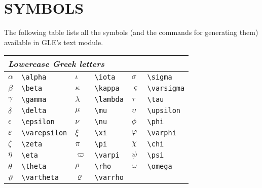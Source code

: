\chapter{SYMBOLS}
The following table lists all the symbols (and the commands for generating 
them) available in GLE's text module.

\begin{tabular}{llllll}
\\
\multicolumn{6}{l}{\em Lowercase Greek letters} \\ \hline
$\alpha$             & \verb+\alpha+             & $\iota$                 & \verb+\iota+               & $\sigma$        & \verb+\sigma+ \\
$\beta$              & \verb+\beta+              & $\kappa$                & \verb+\kappa+              & $\varsigma$     & \verb+\varsigma+ \\
$\gamma$             & \verb+\gamma+             & $\lambda$               & \verb+\lambda+             & $\tau$          & \verb+\tau+ \\
$\delta$             & \verb+\delta+             & $\mu$                   & \verb+\mu+                 & $\upsilon$      & \verb+\upsilon+ \\
$\epsilon$           & \verb+\epsilon+           & $\nu$                   & \verb+\nu+                 & $\phi$          & \verb+\phi+ \\
$\varepsilon$        & \verb+\varepsilon+        & $\xi$                   & \verb+\xi+                 & $\varphi$       & \verb+\varphi+ \\
$\zeta$              & \verb+\zeta+              & $\pi$                   & \verb+\pi+                 & $\chi$          & \verb+\chi+ \\
$\eta$               & \verb+\eta+               & $\varpi$                & \verb+\varpi+              & $\psi$          & \verb+\psi+ \\
$\theta$             & \verb+\theta+             & $\rho$                  & \verb+\rho+                & $\omega$        & \verb+\omega+ \\
$\vartheta$          & \verb+\vartheta+          & $\varrho$               & \verb+\varrho+ \\ 
\end{tabular}
\newpage
